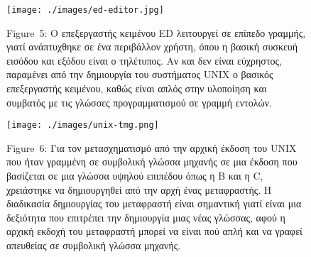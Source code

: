\documentclass[
]{article}
\begin{document}
\leavevmode{}%
\begin{figure}
\hypertarget{fig:ed-editor}{%
\centering
\texttt{[image: ./images/ed-editor.jpg]}
\caption{Figure~5: Ο επεξεργαστής κειμένου ED λειτουργεί σε επίπεδο
γραμμής, γιατί ανάπτυχθηκε σε ένα περιβάλλον χρήστη, όπου η βασική
συσκευή εισόδου και εξόδου είναι ο τηλέτυπος. Αν και δεν είναι
εύχρηστος, παραμένει από την δημιουργία του συστήματος UNIX ο βασικός
επεξεργαστής κειμένου, καθώς είναι απλός στην υλοποίηση και συμβατός με
τις γλώσσες προγραμματισμού σε γραμμή εντολών.}\label{fig:ed-editor}
}
\end{figure}

\leavevmode{}%
\begin{figure}
\hypertarget{fig:unix-tmg}{%
\centering
\texttt{[image: ./images/unix-tmg.png]}
\caption{Figure~6: Για τον μετασχηματισμό από την αρχική έκδοση του UNIX
που ήταν γραμμένη σε συμβολική γλώσσα μηχανής σε μια έκδοση που
βασίζεται σε μια γλώσσα υψηλού επιπέδου όπως η B και η C, χρειάστηκε να
δημιουργηθεί από την αρχή ένας μεταφραστής. Η διαδικασία δημιουργίας του
μεταφραστή είναι σημαντική γιατί είναι μια δεξιότητα που επιτρέπει την
δημιουργία μιας νέας γλώσσας, αφού η αρχική εκδοχή του μεταφραστή μπορεί
να είναι πού απλή και να γραφεί απευθείας σε συμβολική γλώσσα
μηχανής.}\label{fig:unix-tmg}
}
\end{figure}
\end{document}
